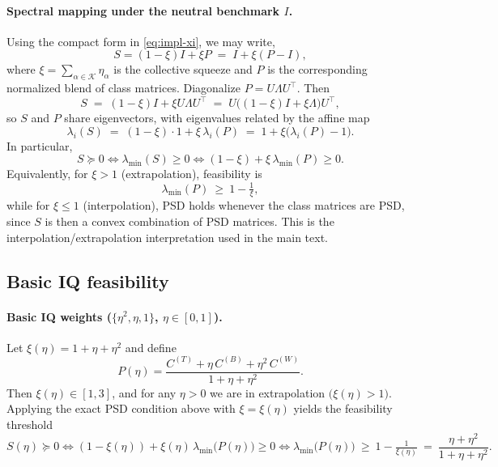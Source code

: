 \documentclass[12pt,letterpaper]{article}
\begin{document}
\paragraph{Spectral mapping under the neutral benchmark \(I\).}
Using the compact form in \eqref{eq:impl-xi}, we may write,
\[
S = (1-\xi)I + \xi P \;=\; I+\xi(P-I),
\]
where \(\xi=\sum_{\alpha\in\mathcal K}\eta_\alpha\) is the collective squeeze and \(P\) is the
corresponding normalized blend of class matrices.
Diagonalize \(P=U\Lambda U^\top\). Then
\[
S \;=\; (1-\xi)I + \xi U\Lambda U^\top
\;=\; U\bigl((1-\xi)I+\xi\Lambda\bigr)U^\top,
\]
so \(S\) and \(P\) share eigenvectors, with eigenvalues related by the affine map
\[
\lambda_i(S) \;=\; (1-\xi)\cdot 1 + \xi\,\lambda_i(P)
\;=\; 1+\xi\bigl(\lambda_i(P)-1\bigr).
\]
In particular,
\[
S\succeq 0
\iff
\lambda_{\min}(S)\ge 0
\iff
(1-\xi)+\xi\,\lambda_{\min}(P)\ge 0.
\]
Equivalently, for \(\xi>1\) (extrapolation), feasibility is
\[
\lambda_{\min}(P)\ \ge\ 1-\tfrac{1}{\xi},
\]
while for \(\xi\le 1\) (interpolation), PSD holds whenever the class matrices are PSD, since \(S\) is then a
convex combination of PSD matrices. This is the interpolation/extrapolation interpretation used in the main text.

\subsection{Basic IQ feasibility}

\paragraph{Basic IQ weights (\(\{\eta^2,\eta,1\}\), \(\eta\in[0,1]\)).}
Let \(\xi(\eta)=1+\eta+\eta^2\) and define
\[
P(\eta)=\frac{C^{(T)} + \eta\, C^{(B)}+ \eta^2\, C^{(W)}}{1+\eta+\eta^2}.
\]
Then \(\xi(\eta)\in[1,3]\), and for any \(\eta>0\) we are in extrapolation \(\bigl(\xi(\eta)>1\bigr)\).
Applying the exact PSD condition above with \(\xi=\xi(\eta)\) yields the feasibility threshold
\[
S(\eta)\succeq 0
\iff
(1-\xi(\eta))+\xi(\eta)\,\lambda_{\min}\!\bigl(P(\eta)\bigr)\ge 0
\iff
\lambda_{\min}\!\bigl(P(\eta)\bigr)\ \ge\ 1-\tfrac{1}{\xi(\eta)}
\ =\ \frac{\eta+\eta^2}{1+\eta+\eta^2}.
\]
\end{document}
